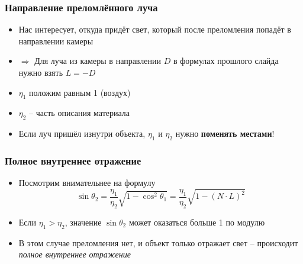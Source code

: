 \documentclass[10pt]{beamer}
\begin{document}
\begin{frame}
\frametitle{Направление преломлённого луча}
\begin{itemize}
\item Нас интересует, откуда придёт свет, который после преломления попадёт в направлении камеры
\pause
\item \begin{math}\Longrightarrow\end{math} Для луча из камеры в направлении \begin{math}D\end{math} в формулах прошлого слайда нужно взять \begin{math}L = -D\end{math}
\pause
\item \begin{math}\eta_1\end{math} положим равным 1 (воздух)
\pause
\item \begin{math}\eta_2\end{math} -- часть описания материала
\pause
\item Если луч пришёл изнутри объекта, \begin{math}\eta_1\end{math} и \begin{math}\eta_2\end{math} нужно \textbf{поменять местами}!
\end{itemize}
\end{frame}

\begin{frame}
\frametitle{Полное внутреннее отражение}
\begin{itemize}
\item Посмотрим внимательнее на формулу
\begin{equation*}
\sin\theta_2 = \frac{\eta_1}{\eta_2}\sqrt{1-\cos^2\theta_1} = \frac{\eta_1}{\eta_2}\sqrt{1-(N\cdot L)^2}
\end{equation*}
\pause
\item Если \begin{math}\eta_1 > \eta_2\end{math}, значение \begin{math}\sin\theta_2\end{math} может оказаться больше 1 по модулю
\pause
\item В этом случае преломления нет, и объект только отражает свет -- происходит \textit{полное внутреннее отражение}
\end{itemize}
\end{frame}
\end{document}
